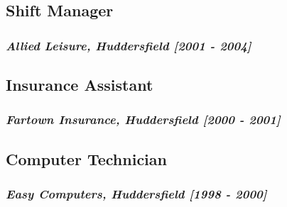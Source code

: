 \documentclass{article}
\begin{document}
\subsection*{Shift Manager}
\subsubsection*{\emph{Allied Leisure, Huddersfield [2001 - 2004]}}
\subsection*{Insurance Assistant}
\subsubsection*{\emph{Fartown Insurance, Huddersfield [2000 - 2001]}}
\subsection*{Computer Technician}
\subsubsection*{\emph{Easy Computers, Huddersfield [1998 - 2000]}}
\end{document}
